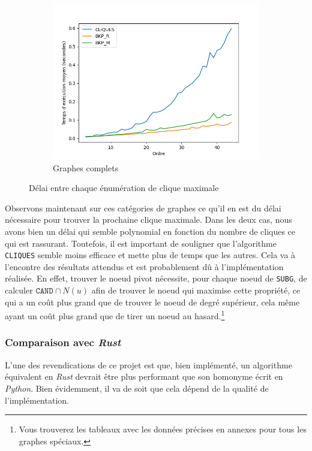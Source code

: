 \documentclass[12pt,a4paper]{article}
\begin{document}
\begin{figure}[ht]
\begin{subfigure}[b]{0.42\textwidth}
    \includegraphics[width=\textwidth]{images/delay_pivot_complete_plot.png}
    \caption{Graphes complets}
    \label{subfig:delay_complete}
  \end{subfigure}
  \caption{Délai entre chaque énumération de clique maximale}
  \label{fig:special_delay}
\end{figure}

Observons maintenant sur ces catégories de graphes ce qu'il en est du délai nécessaire pour trouver la prochaine clique maximale. Dans les deux cas, nous avons bien un délai qui semble polynomial en fonction du nombre de cliques ce qui est rassurant. Toutefois, il est important de souligner que l'algorithme \texttt{CLIQUES} semble moins efficace et mette plus de temps que les autres. Cela va à l'encontre des résultats attendus et est probablement dû à l'implémentation réalisée. En effet, trouver le noeud pivot nécessite, pour chaque noeud de \texttt{SUBG}, de calculer \(\texttt{CAND} \cap N(u)\) afin de trouver le noeud qui maximise cette propriété, ce qui a un coût plus grand que de trouver le noeud de degré supérieur, cela même ayant un coût plus grand que de tirer un noeud au hasard.\footnote{Vous trouverez les tableaux avec les données précises en annexes pour tous les graphes spéciaux.}

\subsubsection*{Comparaison avec \emph{Rust}}

L'une des revendications de ce projet est que, bien implémenté, un algorithme équivalent en \emph{Rust} devrait être plus performant que son homonyme écrit en \emph{Python}. Bien évidemment, il va de soit que cela dépend de la qualité de l'implémentation.
\end{document}
